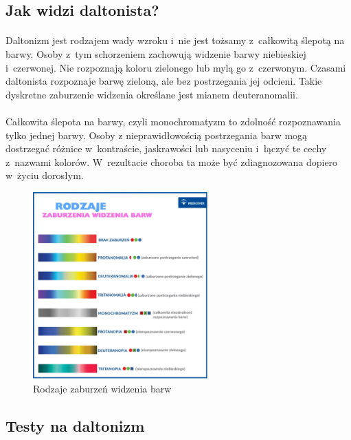 \documentclass[12pt, letterpaper]{article}
\begin{document}
\subsection{Jak widzi daltonista?}

\paragraph{}
Daltonizm jest rodzajem wady wzroku i~nie jest tożsamy z~całkowitą ślepotą na barwy. Osoby z~tym schorzeniem zachowują widzenie barwy niebieskiej i~czerwonej. Nie rozpoznają koloru zielonego lub mylą go z~czerwonym. Czasami daltonista rozpoznaje barwę zieloną, ale bez postrzegania jej odcieni. Takie dyskretne zaburzenie widzenia określane jest mianem deuteranomalii.

\paragraph{}
Całkowita ślepota na barwy, czyli monochromatyzm to zdolność rozpoznawania tylko jednej barwy. Osoby z nieprawidłowością postrzegania barw mogą dostrzegać różnice w~kontraście, jaskrawości lub nasyceniu i~łączyć te cechy z~nazwami kolorów. W~rezultacie choroba ta może być zdiagnozowana dopiero w~życiu dorosłym. 

\begin{figure}[h]
  \centering
      \includegraphics[width=0.6\textwidth]{daltonizm_rodzaje}
  \caption{Rodzaje zaburzeń widzenia barw}
\end{figure}

\subsection{Testy na daltonizm}
\end{document}
